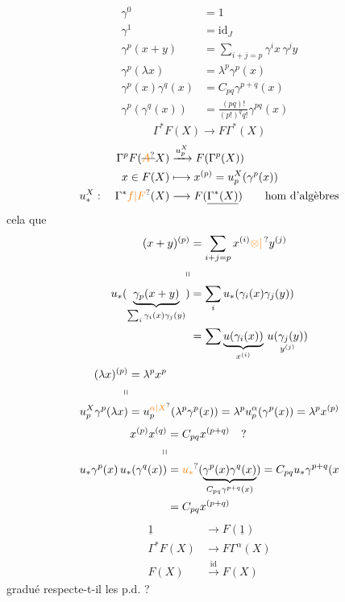 \[
\begin{aligned}
\gamma^0&=1\\
\gamma^1&=\mathrm{id}_J\\
\gamma^p(x+y)&=\sum_{i+j=p}\gamma^i x\,\gamma^j y\\
\gamma^p(\lambda x)&=\lambda^p\gamma^p(x)\\
\gamma^p(x)\gamma^q(x)&=C_{pq}\gamma^{p+q}(x)\\
\gamma^p(\gamma^q(x))&=\frac{(pq)!}{(p!)^q q!}\gamma^{pq}(x)
\end{aligned}
\]
\uline{}
\[
\Gamma^* F(X)\longrightarrow F\Gamma^*(X)
\]
\[
\begin{aligned}
\Gamma^p F(\deleted{\unsure{A}}X)&\xrightarrow{u_p^X} F(\Gamma^p(X))\\
x\in F(X)&\longmapsto x^{(p)}=u_p^X(\gamma^p(x))\\
u_*^X:\quad\Gamma^* \unsure{f|F}(X)&\longrightarrow F(\underline{\Gamma^*(X)})\qquad\text{hom d'algèbres}
\end{aligned}
\]
cela  que
\[
\begin{aligned}
(x+y)^{(p)}&=\sum_{i+j=p}x^{(i)}\unsure{\otimes|\,} y^{(j)}\\
\shortparallel\\
u_*(\underbrace{\gamma_p(x+y)}_{\sum_i\gamma_i(x)\gamma_j(y)})&=\sum_i u_*(\gamma_i(x)\gamma_j(y))\\
&=\sum \underbrace{u(\gamma_i(x))}_{x^{(i)}}\,\underset{y^{(j)}}{u(\gamma_j(y))}
\end{aligned}
\]
\[
\begin{aligned}
(\lambda x)^{(p)}&=\lambda^p x^p\\
\shortparallel\\
u_p^X\gamma^p(\lambda x)&=u_p^{\unsure{\alpha|X}}(\lambda^p\gamma^p(x))=\lambda^p u_p^\alpha(\gamma^p(x))=\lambda^p x^{(p)}
\end{aligned}
\]
\[
\begin{aligned}
x^{(p)}x^{(q)}&=C_{pq}x^{(p+q)}\quad ?\\
\shortparallel\\
u_*\gamma^p(x)\,u_*(\gamma^q(x))&=\unsure{u_*}(\underbrace{\gamma^p(x)\gamma^q(x)}_{C_{pq}\gamma^{p+q}(x)})=C_{pq}u_*\gamma^{p+q}(x\\
&=C_{pq}x^{(p+q)}
\end{aligned}
\]
\[
\begin{aligned}
\underline{1}&\longrightarrow F(\underline{1})\\
\Gamma^* F(X)&\longrightarrow F\Gamma^{\alpha}(X)\\
F(X)&\xrightarrow{\mathrm{id}} F(X)
\end{aligned}
\]
 gradué respecte-t-il les p.d. ?

